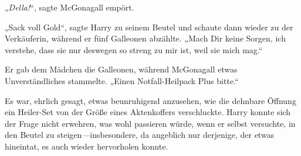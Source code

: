„\emph{Della!}“, sagte McGonagall empört.

„Sack voll Gold“, sagte Harry zu seinem Beutel und schaute dann wieder zu der Verkäuferin, während er fünf Galleonen abzählte. „Mach Dir keine Sorgen, ich verstehe, dass sie nur deswegen so streng zu mir ist, weil sie mich mag.“

Er gab dem Mädchen die Galleonen, während McGonagall etwas Unverständliches stammelte.
„Einen Notfall-Heilpack Plus bitte.“

Es war, ehrlich gesagt, etwas beunruhigend anzusehen, wie die dehnbare Öffnung ein Heiler-Set von der Größe eines Aktenkoffers verschluckte. Harry konnte sich der Frage nicht erwehren, was wohl passieren würde, wenn er selbst versuchte, in den Beutel zu steigen—insbesondere, da angeblich nur derjenige, der etwas hineintat, es auch wieder hervorholen konnte.

